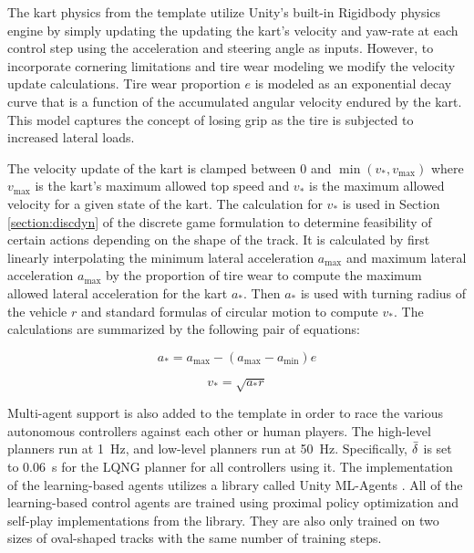 The kart physics from the template utilize Unity's built-in Rigidbody physics engine by simply updating the updating the kart's velocity and yaw-rate at each control step using the acceleration and steering angle as inputs. However, to incorporate cornering limitations and tire wear modeling we modify the velocity update calculations. Tire wear proportion $e$ is modeled as an exponential decay curve that is a function of the accumulated angular velocity endured by the kart. This model captures the concept of losing grip as the tire is subjected to increased lateral loads. 

The velocity update of the kart is clamped between 0 and $\min(v_*, v_{\text{max}})$ where $v_{\text{max}}$ is the kart's maximum allowed top speed and $v_*$ is the maximum allowed velocity for a given state of the kart. The calculation for $v_*$ is used in Section \ref{section:discdyn} of the discrete game formulation to determine feasibility of certain actions depending on the shape of the track. It is calculated by first linearly interpolating the minimum lateral acceleration $a_{\text{max}}$ and maximum lateral acceleration $a_{\text{max}}$ by the proportion of tire wear to compute the maximum allowed lateral acceleration for the kart $a_*$. Then $a_*$ is used with turning radius of the vehicle $r$ and standard formulas of circular motion to compute $v_*$. The calculations are summarized by the following pair of equations:

\begin{equation}
     a_* = a_{\text{max}} - (a_{\text{max}}-a_{\text{min}})e
\end{equation}

\begin{equation}
    v_* = \sqrt{a_*r}
\end{equation}

Multi-agent support is also added to the template in order to race the various autonomous controllers against each other or human players. The high-level planners run at \SI{1}{\hertz}, and low-level planners run at \SI{50}{\hertz}. Specifically, $\Bar{\delta}$ is set to \SI{0.06}{\second} for the LQNG planner for all controllers using it. The implementation of the learning-based agents utilizes a library called Unity ML-Agents \cite{mlagents}. All of the learning-based control agents are trained using proximal policy optimization and self-play implementations from the library. They are also only trained on two sizes of oval-shaped tracks with the same number of training steps. 


